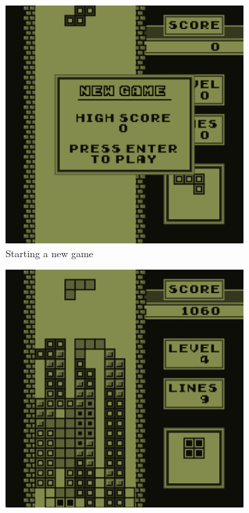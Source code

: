 \begin{figure}[H]
    \centering
    \begin{subfigure}[b]{0.35\textwidth}
        \centering
        \includegraphics[width=\textwidth]{Figures/day_5/new_game.png}
        \caption{Starting a new game}
        \label{fig: new game}
    \end{subfigure}
    \hspace{1cm}
    \begin{subfigure}[b]{0.35\textwidth}
        \centering
        \includegraphics[width=\textwidth]{Figures/day_5/game.png}

\end{subfigure}
\end{figure}
